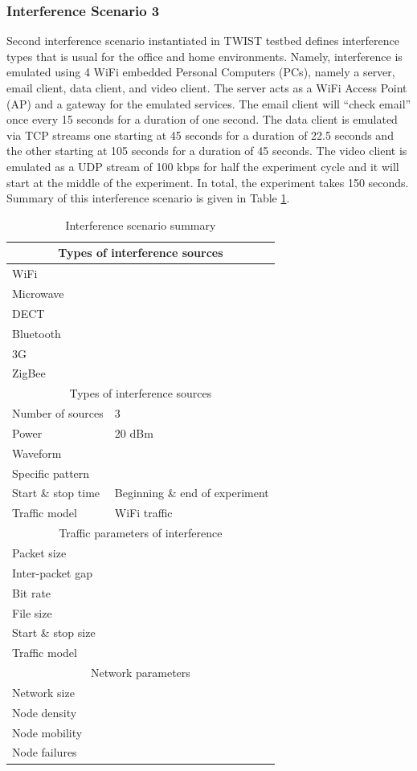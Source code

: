 \documentclass[11pt,a4paper,headinclude,footinclude,chapterprefix=on]{scrreprt}
\begin{document}
\subsubsection{Interference Scenario 3}Second interference scenario instantiated in TWIST testbed defines interference types that is usual for the office and home environments. Namely, interference is emulated using 4 WiFi embedded Personal Computers (PCs), namely a server, email client, data client, and video client. The server acts as a WiFi Access Point (AP) and a gateway for the emulated services. The email client will “check email” once every 15 seconds for a duration of one second. The data client is emulated via TCP streams one starting at 45 seconds for a duration of 22.5 seconds and the other starting at 105 seconds for a duration of 45 seconds. The video client is emulated as a UDP stream of 100 kbps for half the experiment cycle and it will start at the middle of the experiment. In total, the experiment takes 150 seconds. Summary of this interference scenario is given in Table \ref{tb:interf:3}.
\begin{table}
	[h] \centering \caption{Interference scenario summary} \label{tb:interf:3}
	\begin{tabular}
		{|l|l|} \hline \multicolumn{2}{|c|}{Types of interference sources} \\
		\hline WiFi & \checkmark \\
		Microwave & \texttimes \\
		DECT & \texttimes \\
		Bluetooth & \texttimes \\
		3G & \texttimes \\
		ZigBee & \texttimes \\
		\hline \multicolumn{2}{|c|}{Types of interference sources} \\
		\hline Number of sources & 3 \\
		Power & 20 dBm \\
		Waveform & \\
		Specific pattern & \\
		Start \& stop time & Beginning \& end of experiment \\
		Traffic model & WiFi traffic \\
		\hline \multicolumn{2}{|c|}{Traffic parameters of interference} \\
		\hline Packet size & \\
		Inter-packet gap & \\
		Bit rate & \\
		File size & \\
		Start \& stop size & \\
		Traffic model & \\
		\hline \multicolumn{2}{|c|}{Network parameters} \\
		\hline Network size & \\
		Node density & \\
		Node mobility & \\
		Node failures & \\
		\hline 
	\end{tabular}
\end{table}
\end{document}
